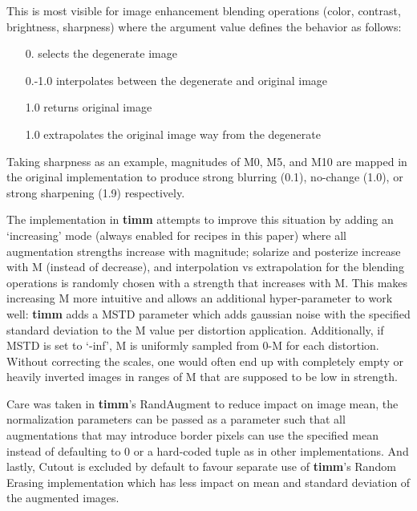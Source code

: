 This is most visible for image enhancement blending operations (color, contrast, brightness, sharpness) where the argument value defines the behavior as follows: 

\begin{minipage}{0.8\linewidth}
\begin{itemize}
    \item [0.] selects the degenerate image
    \item [0.-1.0] interpolates between the degenerate and original image
    \item [1.0] returns original image
    \item [ 1.0] extrapolates the original image way from the degenerate
\end{itemize}
\end{minipage}


Taking sharpness as an example, magnitudes of M0, M5, and M10 are mapped in the original implementation to produce strong blurring (0.1), no-change (1.0), or strong sharpening (1.9) respectively.

The implementation in \textbf{timm} attempts to improve this situation by adding an ‘increasing’ mode (always enabled for recipes in this paper) where all augmentation strengths increase with magnitude; solarize and posterize increase with M (instead of decrease), and interpolation vs extrapolation for the blending operations is randomly chosen with a strength that increases with M. This makes increasing M more intuitive and allows an additional hyper-parameter to work well: \textbf{timm} adds a MSTD parameter which adds gaussian noise with the specified standard deviation to the M value per distortion application. Additionally, if MSTD is set to ‘-inf’, M is uniformly sampled from 0-M for each distortion. Without correcting the scales, one would often end up with completely empty or heavily inverted images in ranges of M that are supposed to be low in strength.

Care was taken in \textbf{timm}’s RandAugment to reduce impact on image mean, the normalization parameters can be passed as a parameter such that all augmentations that may introduce border pixels can use the specified mean instead of defaulting to 0 or a hard-coded tuple as in other implementations. And lastly, Cutout is excluded by default to favour separate use of \textbf{timm}’s Random Erasing implementation which has less impact on mean and standard deviation of the augmented images. 

